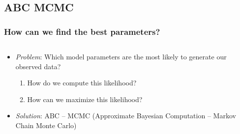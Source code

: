 \documentclass[11pt]{beamer}
\begin{document}
	\subsection{ABC MCMC}\label{subsec:abcmcmc}
    \begin{frame}
        \frametitle{How can we find the best parameters?}
        \begin{columns}
            \begin{column}{0.6\textwidth}
                \begin{itemize}
                    \item \emph{Problem}: Which model parameters are the most likely to generate our observed data?
                        \begin{enumerate}
                            \item How do we compute this likelihood? \smallskip
                            \item How can we maximize this likelihood?
                        \end{enumerate} \bigskip
                    \item \emph{Solution}: ABC -- MCMC (\footnotesize{Approximate Bayesian Computation -- Markov
                        Chain Monte Carlo})
                \end{itemize}
            \end{column}
            \begin{column}{0.4\textwidth}
                \begin{flushleft}
                    
                \end{flushleft}
            \end{column}
        \end{columns}

    \end{frame}
\end{document}
